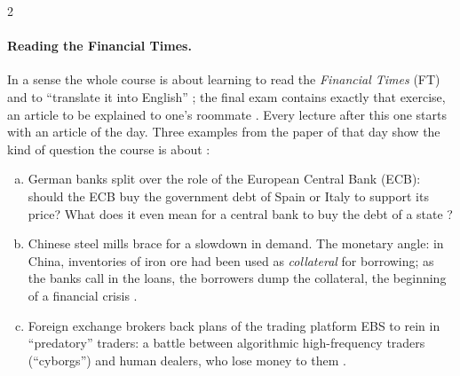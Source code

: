 \begin{paracol}{2}
\paragraph{Reading the Financial Times.} In a sense the whole course is about learning to read the
\emph{Financial Times} (FT) and to ``translate it into English'' ; the final exam contains
exactly that exercise, an article to be explained to one's roommate . Every lecture
after this one starts with an article of the day. Three examples from the paper of that day show the
kind of question the course is about :
\begin{enumerate}[(a)]
  \item German banks split over the role of the European Central Bank (ECB): should the ECB buy the
        government debt of Spain or Italy to support its price? What does it even mean for a central
        bank to buy the debt of a state ?
  \item Chinese steel mills brace for a slowdown in demand. The monetary angle: in China, inventories of
        iron ore had been used as \emph{collateral} for borrowing; as the banks call in the loans, the
        borrowers dump the collateral, the beginning of a financial crisis .
  \item Foreign exchange brokers back plans of the trading platform EBS to rein in ``predatory'' traders:
        a battle between algorithmic high-frequency traders (``cyborgs'') and human dealers, who lose
        money to them .
\end{enumerate}


\end{paracol}
